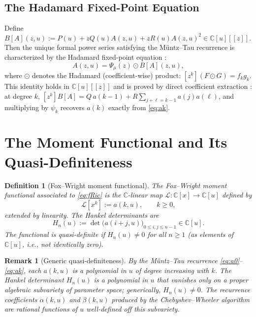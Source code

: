 \documentclass{article}
\newtheorem{definition}{Definition}
\newtheorem{remark}{Remark}
\newcommand{\C}{\mathbb{C}}
\begin{document}
\subsection{The Hadamard Fixed-Point Equation}

Define $B[A](z,u) := P(u) + zQ(u)A(z,u) + zR(u)A(z,u)^2 \in \C[u][[z]]$.
Then the unique formal power series satisfying the Müntz--Tau recurrence is
characterized by the Hadamard fixed-point equation \cite{Crowley2026}:
\begin{equation}\label{eq:hadamard_fp}
  A(z,u) = \Psi_\mu(z) \odot B[A](z,u),
\end{equation}
where $\odot$ denotes the Hadamard (coefficient-wise) product:
$[z^k](F\odot G) = f_k g_k$. This identity holds in $\C[u][[z]]$ and is
proved by direct coefficient extraction \cite{Crowley2026}: at degree $k$,
$[z^k]B[A] = Q\,a(k{-}1) + R\sum_{j+\ell=k-1}a(j)a(\ell)$, and
multiplying by $\psi_k$ recovers $a(k)$ exactly from \eqref{eq:ak}.

\section{The Moment Functional and Its Quasi-Definiteness}

\begin{definition}[Fox--Wright moment functional]
The \emph{Fox--Wright moment functional} associated to \eqref{eq:fRic} is
the $\C$-linear map $\mathcal{L}: \C[x] \to \C[u]$ defined by
\begin{equation}\label{eq:L_def}
  \mathcal{L}[x^k] := a(k,u), \qquad k \ge 0,
\end{equation}
extended by linearity. The Hankel determinants are
\begin{equation}\label{eq:hankel}
  H_n(u) := \det\!\bigl(a(i+j,u)\bigr)_{0\le i,j\le n-1} \in \C[u].
\end{equation}
The functional is \emph{quasi-definite} if $H_n(u) \ne 0$ for all $n \ge 1$
(as elements of $\C[u]$, i.e., not identically zero).
\end{definition}

\begin{remark}[Generic quasi-definiteness]
By the Müntz--Tau recurrence \eqref{eq:a0}--\eqref{eq:ak}, each $a(k,u)$ is
a polynomial in $u$ of degree increasing with $k$. The Hankel determinant
$H_n(u)$ is a polynomial in $u$ that vanishes only on a proper algebraic
subvariety of parameter space; generically, $H_n(u) \ne 0$.
The recurrence coefficients $\alpha(k,u)$ and $\beta(k,u)$ produced by the
Chebyshev--Wheeler algorithm \cite{Wheeler1974,Gragg1972} are rational
functions of $u$ well-defined off this subvariety.
\end{remark}
\end{document}
